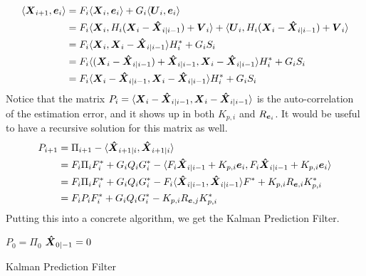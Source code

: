 \begin{align*}
	\langle \boldsymbol{X}_{i+1}, \boldsymbol{e}_i \rangle &= F_i\langle \boldsymbol{X}_i, \boldsymbol{e}_i \rangle + G_i\langle \boldsymbol{U}_i, \boldsymbol{e}_i \rangle\\
	&= F_i\langle \boldsymbol{X}_i, H_i(\boldsymbol{X}_i - \boldsymbol{\hat{X}}_{i|i-1})+\boldsymbol{V}_i \rangle + \langle \boldsymbol{U}_i, H_i(\boldsymbol{X}_i - \boldsymbol{\hat{X}}_{i|i-1})+\boldsymbol{V}_i \rangle \\
	&= F_i\langle \boldsymbol{X}_i, \boldsymbol{X}_i - \boldsymbol{\hat{X}}_{i|i-1} \rangle H_i^* + G_iS_i\\
	&= F_i\langle (\boldsymbol{X}_i - \boldsymbol{\hat{X}}_{i|i-1}) + \boldsymbol{\hat{X}}_{i|i-1}, \boldsymbol{X}_i - \boldsymbol{\hat{X}}_{i|i-1} \rangle H_i^* + G_iS_i\\
	&= F_i\langle \boldsymbol{X}_i - \boldsymbol{\hat{X}}_{i|i-1}, \boldsymbol{X}_i - \boldsymbol{\hat{X}}_{i|i-1} \rangle H_i^* + G_iS_i
\end{align*}
Notice that the matrix $P_i = \langle \boldsymbol{X}_i - \boldsymbol{\hat{X}}_{i|i-1}, \boldsymbol{X}_i - \boldsymbol{\hat{X}}_{i|i-1} \rangle$ is the auto-correlation of the estimation error, and it shows up in both $K_{p,i}$ and $R_{\boldsymbol{e}_i}$.
It would be useful to have a recursive solution for this matrix as well.
\begin{align*}
	P_{i+1} &= \Pi_{i+1}-\langle \boldsymbol{\hat{X}}_{i+1|i}, \boldsymbol{\hat{X}}_{i+1|i} \rangle \\
	&= F_i\Pi_iF_i^* + G_iQ_iG_i^* - \langle F_i\boldsymbol{\hat{X}}_{i|i-1}+K_{p,i}\boldsymbol{e}_i, F_i\boldsymbol{\hat{X}}_{i|i-1}+K_{p,i}\boldsymbol{e}_i \rangle\\
	&= F_i\Pi_iF_i^* + G_iQ_iG_i^* - F_i\langle \boldsymbol{\hat{X}}_{i|i-1}, \boldsymbol{\hat{X}}_{i|i-1} \rangle F^*+K_{p,i}R_{\boldsymbol{e},i}K_{p,i}^*\\
	&= F_iP_iF_i^* + G_iQ_iG_i^* - K_{p,i}R_{\boldsymbol{e},j}K_{p,i}^*
\end{align*}
Putting this into a concrete algorithm, we get the Kalman Prediction Filter.

\begin{algorithm}[H]
	\SetAlgoLined
	$P_0 = \Pi_0$\;
	$\boldsymbol{\hat{X}}_{0|-1} = 0$\;
	\caption{Kalman Prediction Filter}
\end{algorithm}
